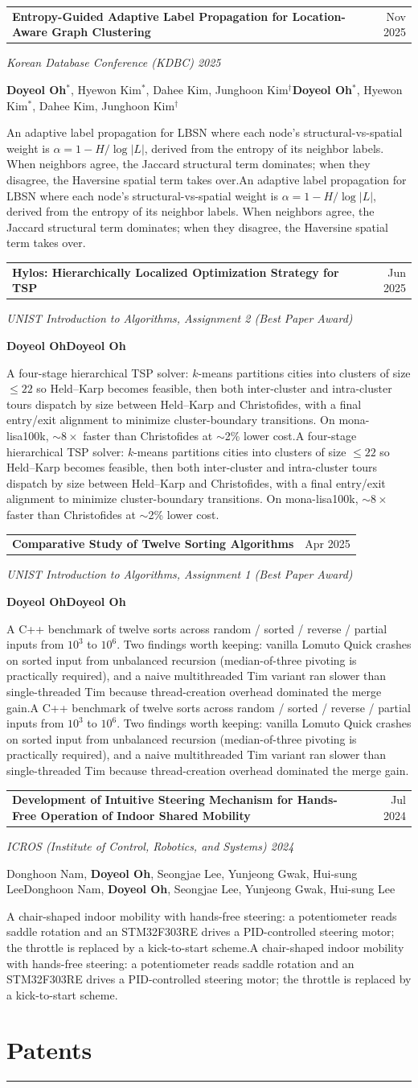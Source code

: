 \documentclass[11pt,letterpaper]{article}
\makeatletter
\newcommand{\pub}[5]{%
  \noindent\begin{tabularx}{\linewidth}{@{}X r@{}}\textbf{#1} & {#3}\end{tabularx}\par
  \noindent\emph{#2}\par
  \ifx\relax#4\relax\else\noindent #4\par\fi
  \ifx\relax#5\relax\else\noindent\small #5\par\fi
  \vspace{10pt}
}
\makeatother
\begin{document}
\pub{Entropy-Guided Adaptive Label Propagation for Location-Aware Graph Clustering}
{Korean Database Conference (KDBC) 2025}
{Nov 2025}
{\textbf{Doyeol Oh}$^{*}$, Hyewon Kim$^{*}$, Dahee Kim, Junghoon Kim$^{\dagger}$}
{An adaptive label propagation for LBSN where each node's structural-vs-spatial weight is $\alpha = 1 - H/\log|L|$, derived from the entropy of its neighbor labels. When neighbors agree, the Jaccard structural term dominates; when they disagree, the Haversine spatial term takes over.}

\pub{Hylos: Hierarchically Localized Optimization Strategy for TSP}
{UNIST Introduction to Algorithms, Assignment 2 (Best Paper Award)}
{Jun 2025}
{\textbf{Doyeol Oh}}
{A four-stage hierarchical TSP solver: $k$-means partitions cities into clusters of size $\leq 22$ so Held--Karp becomes feasible, then both inter-cluster and intra-cluster tours dispatch by size between Held--Karp and Christofides, with a final entry/exit alignment to minimize cluster-boundary transitions. On mona-lisa100k, $\sim 8\times$ faster than Christofides at $\sim$2\% lower cost.}

\pub{Comparative Study of Twelve Sorting Algorithms}
{UNIST Introduction to Algorithms, Assignment 1 (Best Paper Award)}
{Apr 2025}
{\textbf{Doyeol Oh}}
{A C++ benchmark of twelve sorts across random / sorted / reverse / partial inputs from $10^3$ to $10^6$. Two findings worth keeping: vanilla Lomuto Quick crashes on sorted input from unbalanced recursion (median-of-three pivoting is practically required), and a naive multithreaded Tim variant ran slower than single-threaded Tim because thread-creation overhead dominated the merge gain.}

\pub{Development of Intuitive Steering Mechanism for Hands-Free Operation of Indoor Shared Mobility}
{ICROS (Institute of Control, Robotics, and Systems) 2024}
{Jul 2024}
{Donghoon Nam, \textbf{Doyeol Oh}, Seongjae Lee, Yunjeong Gwak, Hui-sung Lee}
{A chair-shaped indoor mobility with hands-free steering: a potentiometer reads saddle rotation and an STM32F303RE drives a PID-controlled steering motor; the throttle is replaced by a kick-to-start scheme.}

\vspace{4pt}
\section*{Patents}
\vspace{-4pt}
\rule{\textwidth}{0.5pt}\vspace{2pt}
\end{document}
